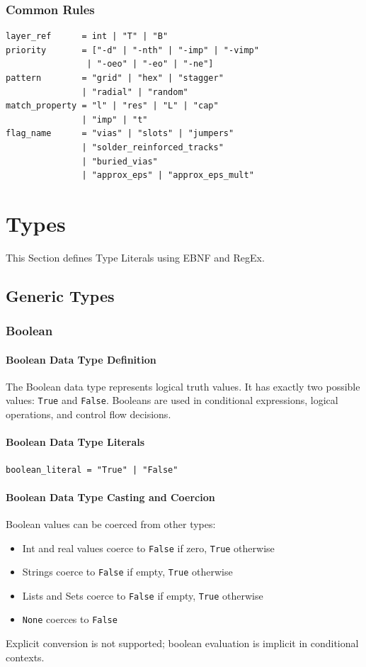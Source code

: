 \documentclass{report}
\begin{document}
\subsection{Common Rules}
\begin{verbatim}
layer_ref      = int | "T" | "B"
priority       = ["-d" | "-nth" | "-imp" | "-vimp"
                | "-oeo" | "-eo" | "-ne"]
pattern        = "grid" | "hex" | "stagger"
               | "radial" | "random"
match_property = "l" | "res" | "L" | "cap"
               | "imp" | "t"
flag_name      = "vias" | "slots" | "jumpers"
               | "solder_reinforced_tracks"
               | "buried_vias"
               | "approx_eps" | "approx_eps_mult"
\end{verbatim}


\chapter{Types}
\label{ch:types}
This Section defines Type Literals using EBNF and RegEx.
\section{Generic Types}
\label{sec:generic-types}
\subsection{Boolean}
\subsubsection{Boolean Data Type Definition}
The Boolean data type represents logical truth values. It has exactly two possible values: \texttt{True} and \texttt{False}. Booleans are used in conditional expressions, logical operations, and control flow decisions.

\subsubsection{Boolean Data Type Literals}
\begin{verbatim}
boolean_literal = "True" | "False"
\end{verbatim}
\subsubsection{Boolean Data Type Casting and Coercion}
Boolean values can be coerced from other types:
\begin{itemize}
\item Int and real values coerce to \texttt{False} if zero, \texttt{True} otherwise
\item Strings coerce to \texttt{False} if empty, \texttt{True} otherwise
\item Lists and Sets coerce to \texttt{False} if empty, \texttt{True} otherwise
\item \texttt{None} coerces to \texttt{False}
\end{itemize}
Explicit conversion is not supported; boolean evaluation is implicit in conditional contexts.
\end{document}
